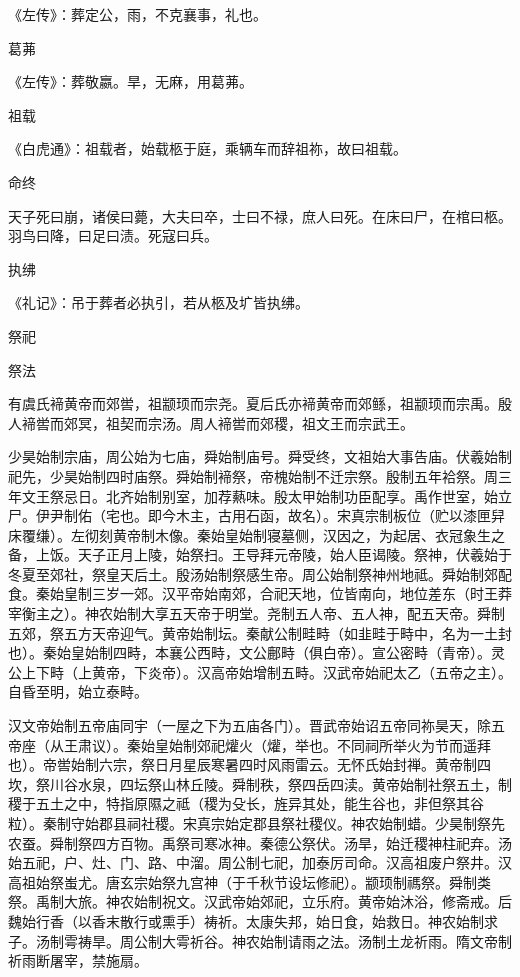 \documentclass[a4paper,12pt,UTF8,twoside]{ctexbook}
\begin{document}
    《左传》：葬定公，雨，不克襄事，礼也。
    
    葛茀
    
    《左传》：葬敬嬴。旱，无麻，用葛茀。
    
    祖载
    
    《白虎通》：祖载者，始载柩于庭，乘辆车而辞祖祢，故曰祖载。
    
    命终
    
    天子死曰崩，诸侯曰薨，大夫曰卒，士曰不禄，庶人曰死。在床曰尸，在棺曰柩。羽鸟曰降，曰足曰渍。死寇曰兵。
    
    执绋
    
    《礼记》：吊于葬者必执引，若从柩及圹皆执绋。
    
    祭祀
    
    祭法
    
    有虞氏褅黄帝而郊喾，祖颛顼而宗尧。夏后氏亦褅黄帝而郊鲧，祖颛顼而宗禹。殷人褅喾而郊冥，祖契而宗汤。周人褅喾而郊稷，祖文王而宗武王。
    
    少昊始制宗庙，周公始为七庙，舜始制庙号。舜受终，文祖始大事告庙。伏羲始制祀先，少昊始制四时庙祭。舜始制褅祭，帝槐始制不迁宗祭。殷制五年袷祭。周三年文王祭忌日。北齐始制别室，加荐爇味。殷太甲始制功臣配享。禹作世室，始立尸。伊尹制佑（宅也。即今木主，古用石函，故名）。宋真宗制板位（贮以漆匣舁床覆缣）。左彻刻黄帝制木像。秦始皇始制寝墓侧，汉因之，为起居、衣冠象生之备，上饭。天子正月上陵，始祭扫。王导拜元帝陵，始人臣谒陵。祭神，伏羲始于冬夏至郊社，祭皇天后土。殷汤始制祭感生帝。周公始制祭神州地祗。舜始制郊配食。秦始皇制三岁一郊。汉平帝始南郊，合祀天地，位皆南向，地位差东（时王莽宰衡主之）。神农始制大享五天帝于明堂。尧制五人帝、五人神，配五天帝。舜制五郊，祭五方天帝迎气。黄帝始制坛。秦献公制畦畤（如韭畦于畤中，名为一土封也）。秦始皇始制四畤，本襄公西畤，文公鄜畤（俱白帝）。宣公密畤（青帝）。灵公上下畤（上黄帝，下炎帝）。汉高帝始增制五畤。汉武帝始祀太乙（五帝之主）。自昏至明，始立泰畤。
    
    汉文帝始制五帝庙同宇（一屋之下为五庙各门）。晋武帝始诏五帝同祢昊天，除五帝座（从王肃议）。秦始皇始制郊祀爟火（爟，举也。不同祠所举火为节而遥拜也）。帝喾始制六宗，祭日月星辰寒暑四时风雨雷云。无怀氏始封禅。黄帝制四坎，祭川谷水泉，四坛祭山林丘陵。舜制秩，祭四岳四渎。黄帝始制社祭五土，制稷于五土之中，特指原隰之祗（稷为殳长，旌异其处，能生谷也，非但祭其谷粒）。秦制守始郡县祠社稷。宋真宗始定郡县祭社稷仪。神农始制蜡。少昊制祭先农蚕。舜制祭四方百物。禹祭司寒冰神。秦德公祭伏。汤旱，始迁稷神柱祀弃。汤始五祀，户、灶、门、路、中溜。周公制七祀，加泰厉司命。汉高祖废户祭井。汉高祖始祭蚩尤。唐玄宗始祭九宫神（于千秋节设坛修祀）。颛顼制禡祭。舜制类祭。禹制大旅。神农始制祝文。汉武帝始郊祀，立乐府。黄帝始沐浴，修斋戒。后魏始行香（以香末散行或熏手）祷祈。太康失邦，始日食，始救日。神农始制求子。汤制雩祷旱。周公制大雩祈谷。神农始制请雨之法。汤制土龙祈雨。隋文帝制祈雨断屠宰，禁施扇。
    
\end{document}

